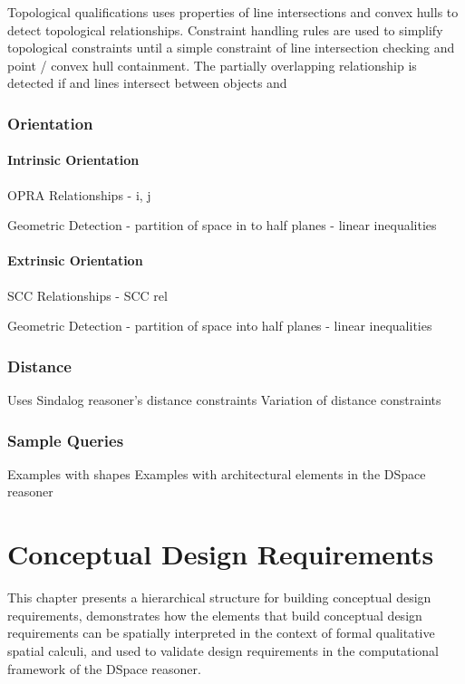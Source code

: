 \documentclass[12pt]{ucthesis}
\begin{document}
Topological qualifications uses properties of line intersections and convex hulls to detect topological relationships. Constraint handling rules are used to simplify topological constraints until a simple constraint of line intersection checking and point / convex hull containment. The partially overlapping relationship is detected if and lines intersect between objects and 

\subsection{Orientation}

\subsubsection{Intrinsic Orientation}
OPRA
Relationships
  - i, j

Geometric Detection
  - partition of space in to half planes
  - linear inequalities

\subsubsection{Extrinsic Orientation}
SCC
Relationships
  - SCC rel
  
Geometric Detection
  - partition of space into half planes
  - linear inequalities

\subsection{Distance}
Uses Sindalog reasoner's distance constraints
Variation of distance constraints

\subsection{Sample Queries}
Examples with shapes
Examples with architectural elements in the DSpace reasoner


\chapter{Conceptual Design Requirements}
This chapter presents a hierarchical structure for building conceptual design requirements, demonstrates how the elements that build conceptual design requirements can be spatially interpreted in the context of formal qualitative spatial calculi, and used to validate design requirements in the computational framework of the DSpace reasoner. 
\end{document}
